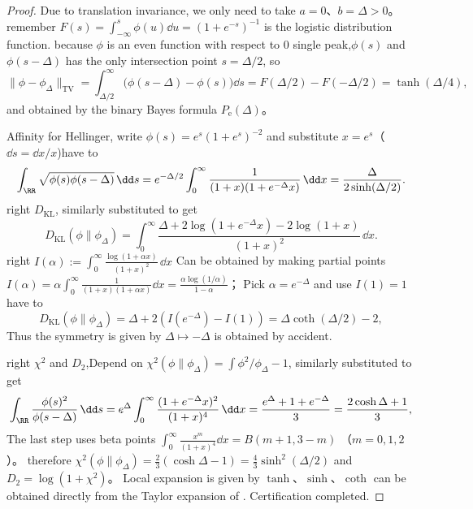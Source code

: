 \begin{proof}
Due to translation invariance, we only need to take \(a=0\)、\(b=\Delta>0\)。
remember \(F(s)=\int_{-\infty}^{s}\phi(u)\dd u=(1+e^{-s})^{-1}\) is the logistic distribution function.
because \(\phi\) is an even function with respect to \(0\) single peak,\(\phi(s)\) and \(\phi(s-\Delta)\) has the only intersection point \(s=\Delta/2\), so
\[
\|\phi-\phi_{\Delta}\|_{\mathrm{TV}}
=\int_{\Delta/2}^{\infty}\bigl(\phi(s-\Delta)-\phi(s)\bigr)\dd s
=F(\Delta/2)-F(-\Delta/2)
=\tanh(\Delta/4),
\]
and obtained by the binary Bayes formula \(P_{\mathrm e}(\Delta)\)。
\par
Affinity for Hellinger, write \(\phi(s)=e^{s}(1+e^{s})^{-2}\) and substitute \(x=e^{s}\)（\(\dd s=\dd x/x\))have to
\[
\int_{\RR}\sqrt{\phi(s)\phi(s-\Delta)}\,\dd s
=e^{-\Delta/2}\int_{0}^{\infty}\frac{1}{(1+x)(1+e^{-\Delta}x)}\,\dd x
=\frac{\Delta}{2\sinh(\Delta/2)}.
\]
right \(D_{\mathrm{KL}}\), similarly substituted to get
\[
D_{\mathrm{KL}}(\phi\|\phi_{\Delta})
=\int_{0}^{\infty}\frac{\Delta+2\log(1+e^{-\Delta}x)-2\log(1+x)}{(1+x)^{2}}\,\dd x.
\]
right
\(
I(\alpha):=\int_{0}^{\infty}\frac{\log(1+\alpha x)}{(1+x)^{2}}\,\dd x
\)
Can be obtained by making partial points
\(
I(\alpha)=\alpha\int_{0}^{\infty}\frac{1}{(1+x)(1+\alpha x)}\dd x
=\frac{\alpha\log(1/\alpha)}{1-\alpha}
\)；
Pick \(\alpha=e^{-\Delta}\) and use \(I(1)=1\) have to
\[
D_{\mathrm{KL}}(\phi\|\phi_{\Delta})
=\Delta+2(I(e^{-\Delta})-I(1))
=\Delta\coth(\Delta/2)-2,
\]
Thus the symmetry is given by \(\Delta\mapsto-\Delta\) is obtained by accident.
\par
right \(\chi^2\) and \(D_2\),Depend on
\(
\chi^2(\phi\|\phi_{\Delta})=\int \phi^2/\phi_{\Delta}-1
\), similarly substituted to get
\[
\int_{\RR}\frac{\phi(s)^2}{\phi(s-\Delta)}\,\dd s
=e^{\Delta}\int_{0}^{\infty}\frac{(1+e^{-\Delta}x)^{2}}{(1+x)^{4}}\,\dd x
=\frac{e^{\Delta}+1+e^{-\Delta}}{3}
=\frac{2\cosh\Delta+1}{3},
\]
The last step uses beta points
\(
\int_{0}^{\infty}\frac{x^{m}}{(1+x)^{4}}\dd x=B(m+1,3-m)
\)
（\(m=0,1,2\)）。
therefore
\(
\chi^2(\phi\|\phi_{\Delta})=\frac{2}{3}(\cosh\Delta-1)=\frac{4}{3}\sinh^{2}(\Delta/2)
\)
and \(D_2=\log(1+\chi^2)\)。
Local expansion is given by \(\tanh\)、\(\sinh\)、\(\coth\) can be obtained directly from the Taylor expansion of . Certification completed.
\end{proof}



